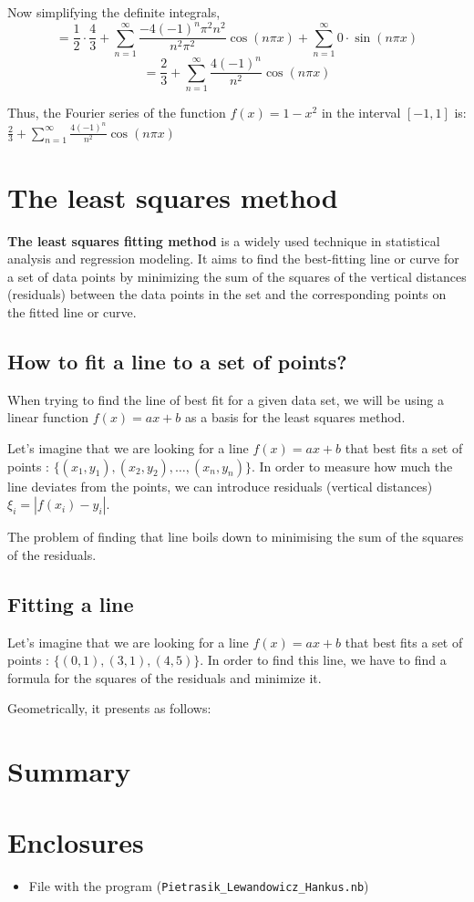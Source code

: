 \documentclass{MathematicaReport}
\begin{document}
Now simplifying the definite integrals,
\[ = \frac{1}{2} \cdot \frac{4}{3} + \sum_{n=1}^{\infty} \frac{-4(-1)^n\pi^2n^2}{n^2\pi^2} \cos(n\pi x) + \sum_{n=1}^{\infty} 0 \cdot \sin(n\pi x) \]
\[ = \frac{2}{3} + \sum_{n=1}^{\infty} \frac{4(-1)^n}{n^2} \cos(n\pi x) \]

Thus, the Fourier series of the function $f(x)=1-x^2$ in the interval 
$[-1,1]$ is: $\frac{2}{3} + \sum_{n=1}^{\infty} \frac{4(-1)^n}{n^2} \cos(n\pi x)$

\section{The least squares method}
\textbf{The least squares fitting method} is a widely used technique in statistical
analysis and regression modeling. It aims to find the best-fitting line or curve
for a set of data points by minimizing the sum of the squares of the
vertical distances (residuals) between the data points in the set and the
corresponding points on the fitted line or curve. 

\subsection{How to fit a line to a set of points?}
When trying to find the line of best fit for a given data set, we will be using
a linear function \( f(x) = ax + b \)  as a basis for the least squares method.

Let's imagine that we are looking for a line \( f(x) = ax + b \) that best fits 
a set of points : \( \{(x_1,y_1), (x_2,y_2),\ldots,(x_n,y_n)\} \). 
In order to measure how much the line deviates from the points, we can introduce
residuals (vertical distances) \( \xi_i = | f(x_i) - y_i |  \). 

The problem of finding that line boils down to minimising the sum of the 
squares of the residuals.

\subsection{Fitting a line}
Let's imagine that we are looking for a line \( f(x) = ax + b \) that best fits 
a set of points : \( \{(0,1), (3,1), (4,5)\} \). In order to find this line,
we have to find a formula for the squares of the residuals and minimize it.

Geometrically, it presents as follows:
\begin{center}
	
\end{center}


\section{Summary}

\section*{Enclosures} 
\begin{itemize}
	\item File with the program (\texttt{Pietrasik\_Lewandowicz\_Hankus.nb})
\end{itemize}
\end{document}
